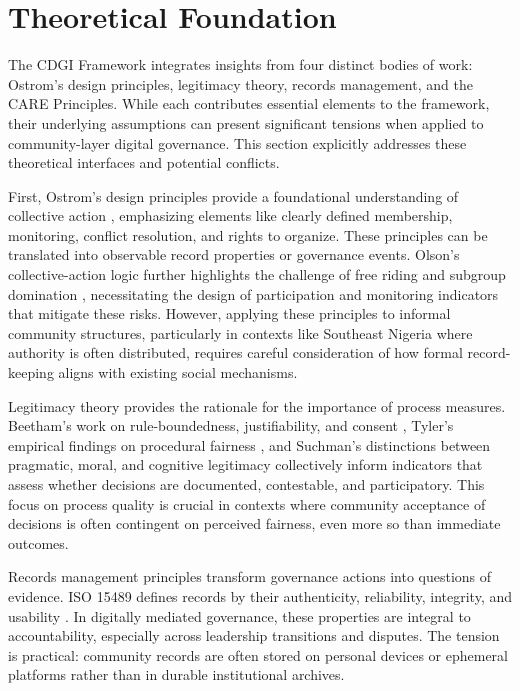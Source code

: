 \documentclass[sigconf,anonymous]{acmart}
\begin{document}
\section{Theoretical Foundation}

The CDGI Framework integrates insights from four distinct bodies of work: Ostrom’s design principles, legitimacy theory, records management, and the CARE Principles. While each contributes essential elements to the framework, their underlying assumptions can present significant tensions when applied to community-layer digital governance. This section explicitly addresses these theoretical interfaces and potential conflicts.

First, Ostrom’s design principles provide a foundational understanding of collective action \cite{ostrom1990}, emphasizing elements like clearly defined membership, monitoring, conflict resolution, and rights to organize. These principles can be translated into observable record properties or governance events. Olson’s collective-action logic further highlights the challenge of free riding and subgroup domination \cite{olson1965}, necessitating the design of participation and monitoring indicators that mitigate these risks. However, applying these principles to informal community structures, particularly in contexts like Southeast Nigeria where authority is often distributed, requires careful consideration of how formal record-keeping aligns with existing social mechanisms.

Legitimacy theory provides the rationale for the importance of process measures. Beetham’s work on rule-boundedness, justifiability, and consent \cite{beetham2013}, Tyler’s empirical findings on procedural fairness \cite{tyler2006}, and Suchman’s distinctions between pragmatic, moral, and cognitive legitimacy \cite{suchman1995} collectively inform indicators that assess whether decisions are documented, contestable, and participatory. This focus on process quality is crucial in contexts where community acceptance of decisions is often contingent on perceived fairness, even more so than immediate outcomes.

Records management principles transform governance actions into questions of evidence. ISO 15489 defines records by their authenticity, reliability, integrity, and usability \cite{iso2016}. In digitally mediated governance, these properties are integral to accountability, especially across leadership transitions and disputes. The tension is practical: community records are often stored on personal devices or ephemeral platforms rather than in durable institutional archives.
\end{document}

